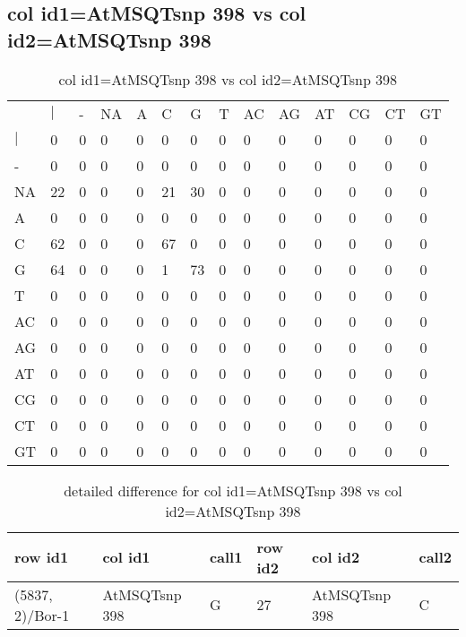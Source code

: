 \subsection{col id1=AtMSQTsnp 398 vs col id2=AtMSQTsnp 398}
\begin{center}
\begin{longtable}{|l|l|l|l|l|l|l|l|l|l|l|l|l|l|}
\caption{col id1=AtMSQTsnp 398 vs col id2=AtMSQTsnp 398} \label{table_dm906}\\
\hline
\\
\hline
&$|$&-&NA&A&C&G&T&AC&AG&AT&CG&CT&GT\\
$|$&0&0&0&0&0&0&0&0&0&0&0&0&0\\
-&0&0&0&0&0&0&0&0&0&0&0&0&0\\
NA&22&0&0&0&21&30&0&0&0&0&0&0&0\\
A&0&0&0&0&0&0&0&0&0&0&0&0&0\\
C&62&0&0&0&67&0&0&0&0&0&0&0&0\\
G&64&0&0&0&1&73&0&0&0&0&0&0&0\\
T&0&0&0&0&0&0&0&0&0&0&0&0&0\\
AC&0&0&0&0&0&0&0&0&0&0&0&0&0\\
AG&0&0&0&0&0&0&0&0&0&0&0&0&0\\
AT&0&0&0&0&0&0&0&0&0&0&0&0&0\\
CG&0&0&0&0&0&0&0&0&0&0&0&0&0\\
CT&0&0&0&0&0&0&0&0&0&0&0&0&0\\
GT&0&0&0&0&0&0&0&0&0&0&0&0&0\\
\hline
\end{longtable}
\end{center}

\begin{center}
\begin{longtable}{|l|l|l|l|l|l|}
\caption{detailed difference for col id1=AtMSQTsnp 398 vs col id2=AtMSQTsnp 398} \label{table_dm907}\\
\hline
row id1&col id1&call1&row id2&col id2&call2\\
\hline
(5837, 2)/Bor-1&AtMSQTsnp 398&G&27&AtMSQTsnp 398&C\\
\hline
\end{longtable}
\end{center}

